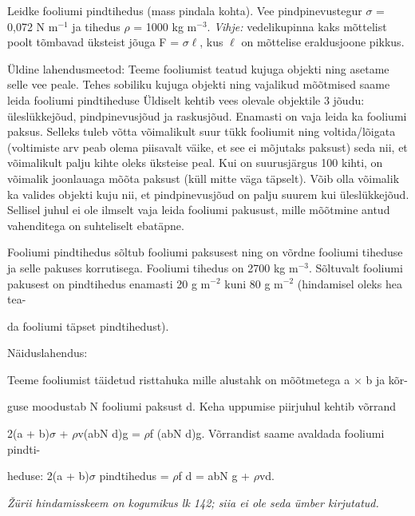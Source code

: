 
Leidke fooliumi pindtihedus (mass pindala kohta). Vee pindpinevustegur $\sigma$ = 0,072 N m$^{-1}$ ja tihedus $\rho$ = 1000 kg m$^{-3}$.
\textit{Vihje:} vedelikupinna kaks mõttelist poolt tõmbavad üksteist jõuga F = $\sigma\ell$, kus $\ell$ on mõttelise eraldusjoone pikkus.

\hint

\solu
Üldine lahendusmeetod: Teeme fooliumist teatud kujuga objekti ning asetame selle vee peale. Tehes sobiliku kujuga objekti ning vajalikud mõõtmised saame leida fooliumi pindtiheduse Üldiselt kehtib vees olevale objektile 3 jõudu: üleslükkejõud, pindpinevusjõud ja raskusjõud. Enamasti on vaja leida ka fooliumi paksus. Selleks tuleb võtta võimalikult suur tükk fooliumit ning voltida/lõigata (voltimiste arv peab olema piisavalt väike, et see ei mõjutaks paksust) seda nii, et võimalikult palju kihte oleks üksteise peal. Kui on suurusjärgus 100 kihti, on võimalik joonlauaga mõõta paksust (küll mitte väga täpselt). Võib olla võimalik ka valides objekti kuju nii, et pindpinevusjõud on palju suurem kui üleslükkejõud. Sellisel juhul ei ole ilmselt vaja leida fooliumi pakusust, mille mõõtmine antud vahenditega on suhteliselt ebatäpne.

Fooliumi pindtihedus sõltub fooliumi paksusest ning on võrdne fooliumi tiheduse ja selle pakuses korrutisega. Fooliumi tihedus on 2700 kg m$^{-3}$. Sõltuvalt fooliumi pakusest on pindtihedus enamasti 20 g m$^{-2}$ kuni 80 g m$^{-2}$ (hindamisel oleks hea tea-

da fooliumi täpset pindtihedust).

Näiduslahendus:

Teeme fooliumist täidetud risttahuka mille alustahk on mõõtmetega a $\times$ b ja kõr-

guse moodustab N fooliumi paksust d. Keha uppumise piirjuhul kehtib võrrand

2(a + b)$\sigma$ + $\rho$v(abN d)g = $\rho$f (abN d)g. Võrrandist saame avaldada fooliumi pindti-

heduse: 2(a + b)$\sigma$ pindtihedus = $\rho$f d = abN g + $\rho$vd.

\textit{Žürii hindamisskeem on kogumikus lk 142; siia ei ole seda ümber kirjutatud.}
\probend
